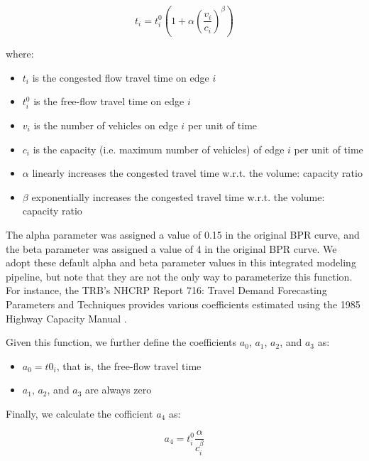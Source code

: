 \bigskip
\begin{equation}
    t_i = t^0_i (1 + \alpha (\frac{v_i}{c_i}) ^ \beta)
    \label{eq:bpr_function}
\end{equation}

\bigskip
where:

\bigskip
\begin{itemize}
    \item $t_i$ is the congested flow travel time on edge $i$
    \item $t^0_i$ is the free-flow travel time on edge $i$
    \item $v_i$ is the number of vehicles on edge $i$ per unit of time 
    \item $c_i$ is the capacity (i.e. maximum number of vehicles) of edge $i$  per unit of time
    \item $\alpha$ linearly increases the congested travel time w.r.t. the volume: capacity ratio
    \item $\beta$ exponentially increases the congested travel time w.r.t. the volume: capacity ratio
\end{itemize}

\bigskip
The alpha parameter was assigned a value of 0.15 in the original BPR curve, and the beta parameter was assigned a value of 4 in the original BPR curve. We adopt these default alpha and beta parameter values in this integrated modeling pipeline, but note that they are not the only way to parameterize this function. For instance, the TRB's NHCRP Report 716: Travel Demand Forecasting Parameters and Techniques provides various coefficients estimated using the 1985 Highway Capacity Manual \citep[p.~75]{transportation_research_board_highway_1985,transportation_research_board_travel_2012}.

\bigskip
Given this function, we further define the coefficients $a_0$, $a_1$, $a_2$, and $a_3$ as:

\bigskip
\begin{itemize}
    \item $a_0 = t0_i$, that is, the free-flow travel time
    \item $a_1$, $a_2$, and $a_3$ are always zero
\end{itemize}

\bigskip
Finally, we calculate the cofficient $a_4$ as:

\begin{equation}
    a_4 = t^0_i \frac{\alpha}{c_i ^ {\beta}}
    \label{eq:bpr_a4_coefficient}
\end{equation}

